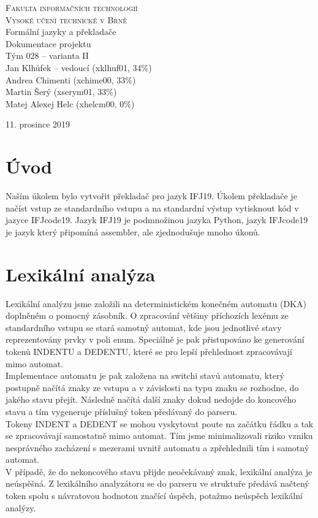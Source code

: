 \documentclass[12pt, a4paper]{article}
\begin{document}
\begin{center}
    \thispagestyle{empty}
    \Huge
    \textsc{Fakulta informačních technologií\\Vysoké učení technické v Brně}\\
    \medskip
    \LARGE{Formální jazyky a překladače \\}
    \Large{ Dokumentace projektu \\ Tým 028 -- varianta II \\}
    \bigskip
    \large{Jan Klhůfek -- vedoucí (xklhuf01, 34\%) \\ Andrea Chimenti (xchime00, 33\%) \\ Martin Šerý (xserym01, 33\%) \\ Matej Alexej Helc (xhelcm00, 0\%)}
\end{center}
{\large 11. prosince 2019 \hfill }

\newpage

\section{Úvod}
\justifying
Naším úkolem bylo vytvořit překladač pro jazyk IFJ19. Úkolem překladače je načíst vstup ze standardního vstupu a na standardní výstup vytisknout kód v jazyce IFJcode19. Jazyk IFJ19 je podmnožinou jazyka Python, jazyk IFJcode19 je jazyk který připomíná assembler, ale zjednodušuje mnoho úkonů.

\section{Lexikální analýza}
\justifying
Lexikální analýzu jsme založili na deterministickém konečném automatu (DKA) doplněném o pomocný zásobník. O zpracování většiny příchozích lexému ze standardního vstupu se stará samotný automat, kde jsou jednotlivé stavy reprezentovány prvky v poli enum. Speciálně je pak přistupováno ke generování tokenů INDENTU a DEDENTU, které se pro lepší přehlednost zpracovávají mimo automat.\\
Implementace automatu je pak založena na switchi stavů automatu, který postupně načítá znaky ze vstupu a v závislosti na typu znaku se rozhodne, do jakého stavu přejít. Následně načítá další znaky dokud nedojde do koncového stavu a tím vygeneruje příslušný token předávaný do parseru. \\
Tokeny INDENT a DEDENT se mohou vyskytovat poute na začátku řádku a tak se zpracovávají samostatně mimo automat. Tím jsme minimalizovali riziko vzniku nesprávného zacházení s mezerami uvnitř automatu a zpřehlednili tím i samotný automat. \\
V případě, že do nekoncového stavu přijde neočekávaný znak, lexikální analýza je neúspěšná. Z lexikálního analyzátoru se do parseru ve struktuře předává načtený token spolu s návratovou hodnotou značící úspěch, potažmo neúspěch lexikální analýzy. \\
\end{document}
